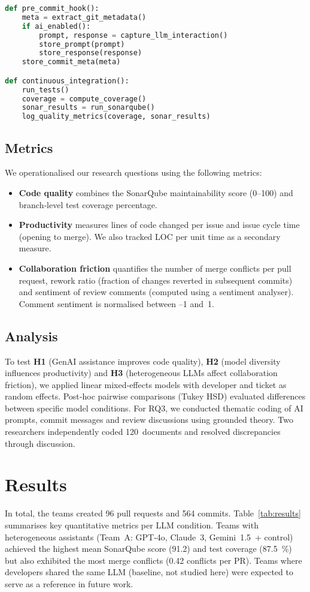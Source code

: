 \documentclass[conference]{IEEEtran}
\begin{document}
\begin{lstlisting}[language=Python, caption={Simplified data‑collection pipeline.}]
def pre_commit_hook():
    meta = extract_git_metadata()
    if ai_enabled():
        prompt, response = capture_llm_interaction()
        store_prompt(prompt)
        store_response(response)
    store_commit_meta(meta)

def continuous_integration():
    run_tests()
    coverage = compute_coverage()
    sonar_results = run_sonarqube()
    log_quality_metrics(coverage, sonar_results)
\end{lstlisting}

\subsection{Metrics}
We operationalised our research questions using the following metrics:
\begin{itemize}
  \item \textbf{Code quality} combines the SonarQube maintainability score (0–100) and branch‑level test coverage percentage.
  \item \textbf{Productivity} measures lines of code changed per issue and issue cycle time (opening to merge).  We also tracked LOC per unit time as a secondary measure.
  \item \textbf{Collaboration friction} quantifies the number of merge conflicts per pull request, rework ratio (fraction of changes reverted in subsequent commits) and sentiment of review comments (computed using a sentiment analyser).  Comment sentiment is normalised between –1 and 1.
\end{itemize}

\subsection{Analysis}
To test \textbf{H1} (GenAI assistance improves code quality), \textbf{H2} (model diversity influences productivity) and \textbf{H3} (heterogeneous LLMs affect collaboration friction), we applied linear mixed‑effects models with developer and ticket as random effects.  Post‑hoc pairwise comparisons (Tukey HSD) evaluated differences between specific model conditions.  For RQ3, we conducted thematic coding of AI prompts, commit messages and review discussions using grounded theory.  Two researchers independently coded 120 documents and resolved discrepancies through discussion.

\section{Results}
In total, the teams created 96 pull requests and 564 commits.  Table \ref{tab:results} summarises key quantitative metrics per LLM condition.  Teams with heterogeneous assistants (Team A: GPT‑4o, Claude 3, Gemini 1.5 + control) achieved the highest mean SonarQube score (91.2) and test coverage (87.5 \%) but also exhibited the most merge conflicts (0.42 conflicts per PR).  Teams where developers shared the same LLM (baseline, not studied here) were expected to serve as a reference in future work.
\end{document}
